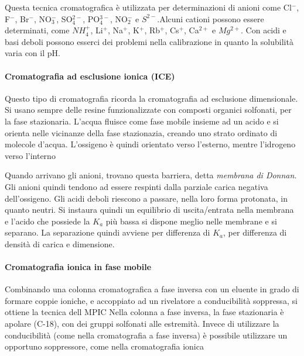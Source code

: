 
Questa tecnica cromatografica è utilizzata per determinazioni di anioni come Cl$^-$, F$^-$, Br$^-$, NO$_3^-$, SO$_4^{2-}$, PO$_4^{3-}$, NO$_2^-$ e $S^{2-}$.Alcuni cationi possono essere determinati, come $NH_4^+$, Li$^+$, Na$^+$, K$^+$, Rb$^+$, Cs$^+$, Ca$^{2+}$ e $Mg^{2+}$. Con acidi e basi deboli possono esserci dei problemi nella calibrazione in quanto la solubilità varia con il pH. 


\paragraph{Cromatografia ad esclusione ionica (ICE)} 

Questo tipo di cromatografia ricorda la cromatografia ad esclusione dimensionale. Si usano sempre delle resine funzionalizzate con composti organici solfonati, per la fase stazionaria.
L'acqua fluisce come fase mobile insieme ad un acido e si orienta nelle vicinanze della fase stazionazia, creando uno strato ordinato di molecole d'acqua.
L'ossigeno è quindi orientato verso l'esterno, mentre l'idrogeno verso l'interno


Quando arrivano gli anioni, trovano questa barriera, detta \emph{membrana di Donnan}. Gli anioni quindi tendono ad essere respinti dalla parziale carica negativa dell'ossigeno.
Gli acidi deboli riescono a passare, nella loro forma protonata, in quanto neutri.
Si instaura quindi un equilibrio di uscita/entrata nella membrana e l'acido che possiede la $K_a$ più bassa si dispone meglio nelle membrane e si separano. 
La separazione quindi avviene per differenza di $K_a$, per differenza di densità di carica e dimensione. 

\paragraph{Cromatografia ionica in fase mobile}
Combinando una colonna cromatografica a fase inversa con un eluente in grado di formare coppie ioniche, e accoppiato ad un rivelatore a conducibilità soppressa, si ottiene la tecnica dell MPIC
Nella colonna a fase inversa, la fase stazionaria è apolare (C-18), con dei gruppi solfonati alle estremità.
Invece di utilizzare la conducibilità (come nella cromatografia a fase inversa) è possibile utilizzare un opportuno soppressore, come nella cromatografia ionica

